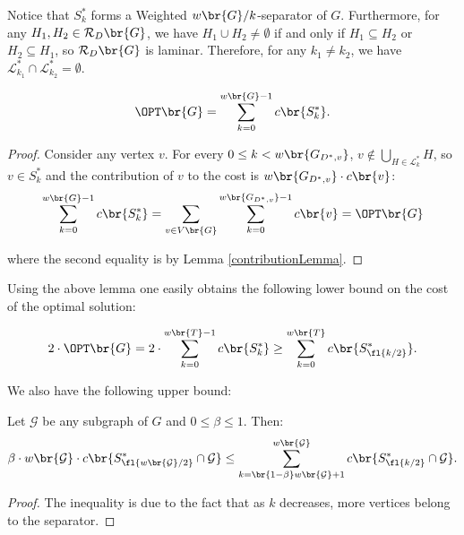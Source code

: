 Notice that $S_{k}^*$ forms a Weighted $w\br{G}/k$-separator of $G$. 
Furthermore, for any $H_1, H_2 \in \mathcal{R}_D\br{G}$, we have 
$H_1 \cup H_2 \neq \emptyset$ if and only if $H_1 \subseteq H_2$ or 
$H_2 \subseteq H_1$, so $\mathcal{R}_D\br{G}$ is laminar. 
Therefore, for any $k_1 \neq k_2$, we have 
$\mathcal{L}_{k_1}^* \cap \mathcal{L}_{k_2}^* = \emptyset$.
\begin{lemma}
                $$\OPT\br{G}=\sum_{k=0}^{w\br{G}-1}c\br{S_{k}^*}.$$
                
            \begin{proof}
                Consider any vertex $v$. For every $0\leq k<w\br{G_{D^*,v}}$, $v\notin \bigcup_{H\in \mathcal{L}_{k}^*}H$, so $v\in S_{k}^*$ and the contribution of $v$ to the cost is $w\br{G_{D^*,v}}\cdot c\br{v}$:
                $$\sum_{k=0}^{w\br{G}-1}c\br{S_{k}^*}=\sum_{v\in V\br{G}}\sum_{k=0}^{w\br{G_{D^*,v}}-1}c\br{v}=\OPT\br{G}$$
                
                where the second equality is by Lemma \ref{contributionLemma}.
            \end{proof}
            \end{lemma}
            
Using the above lemma one easily obtains the following lower bound on the cost of the optimal solution:
\begin{lemma}\label{lb_opt}
            $$
            2\cdot\OPT\br{G}= 2\cdot\sum_{k=0}^{w\br{T}-1}c\br{S_{k}^*} \geq \sum_{k=0}^{w\br{T}}c\br{S_{\fl{k/2}}^*}.
            $$
\end{lemma}

We also have the following upper bound:
\begin{lemma}\label{splitting}
    Let $\mathcal{G}$ be any subgraph of $G$ and $0\leq\beta\leq 1$. Then: 
            $$
           \beta\cdot w\br{\mathcal{G}}\cdot c\br{S_{\fl{w\br{\mathcal{G}}/2}}^*\cap \mathcal{G}}
            \leq \sum_{k=\br{1-\beta}w\br{\mathcal{G}}+1}^{w\br{\mathcal{G}}}c\br{S_{\fl{k/2}}^*\cap \mathcal{G}}.
            $$
    \begin{proof}
        The inequality is due to the fact that as $k$ decreases, more vertices belong to the separator. 
    \end{proof}
\end{lemma}


% 

